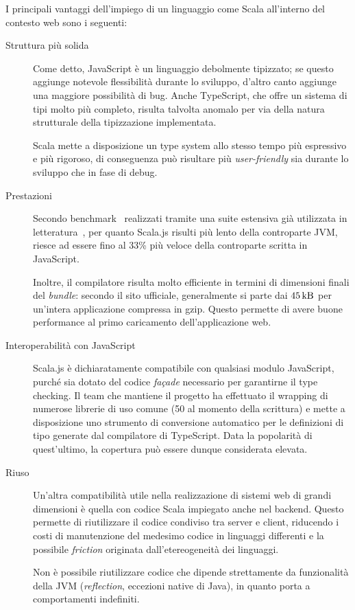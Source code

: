       I principali vantaggi dell'impiego di un linguaggio come Scala all'interno del contesto web sono i seguenti:
      \begin{description}
        \item[Struttura più solida]
          Come detto, JavaScript è un linguaggio debolmente tipizzato;
          se questo aggiunge notevole flessibilità durante lo sviluppo, d'altro canto aggiunge una maggiore possibilità di bug.
          Anche TypeScript, che offre un sistema di tipi molto più completo, risulta talvolta anomalo per via della natura strutturale della tipizzazione implementata.

          Scala mette a disposizione un type system allo stesso tempo più espressivo e più rigoroso, di conseguenza può risultare più \emph{user-friendly} sia durante lo sviluppo che in fase di debug.

        \item[Prestazioni]
          Secondo benchmark~\cite{Doeraene:256862} realizzati tramite una suite estensiva già utilizzata in letteratura~\cite{10.1145/3093334.2989232}, per quanto Scala.js risulti più lento della controparte JVM, riesce ad essere fino al 33\% più veloce della controparte scritta in JavaScript.

          Inoltre, il compilatore risulta molto efficiente in termini di dimensioni finali del \emph{bundle}:
          secondo il sito ufficiale, generalmente si parte dai \(\SI{45}{\kilo\byte}\) per un'intera applicazione compressa in gzip.
          Questo permette di avere buone performance al primo caricamento dell'applicazione web.

        \item[Interoperabilità con JavaScript]
          Scala.js è dichiaratamente compatibile con qualsiasi modulo JavaScript, purché sia dotato del codice \emph{façade} necessario per garantirne il type checking.
          Il team che mantiene il progetto ha effettuato il wrapping di numerose librerie di uso comune (50 al momento della scrittura) e mette a disposizione uno strumento di conversione automatico per le definizioni di tipo generate dal compilatore di TypeScript.
          Data la popolarità di quest'ultimo, la copertura può essere dunque considerata elevata.

        \item[Riuso]
          Un'altra compatibilità utile nella realizzazione di sistemi web di grandi dimensioni è quella con codice Scala impiegato anche nel backend.
          Questo permette di riutilizzare il codice condiviso tra server e client,
          riducendo i costi di manutenzione del medesimo codice in linguaggi differenti e la possibile \emph{friction} originata dall'etereogeneità dei linguaggi.

          Non è possibile riutilizzare codice che dipende strettamente da funzionalità della JVM (\emph{reflection}, eccezioni native di Java), in quanto porta a comportamenti indefiniti.
      \end{description}

